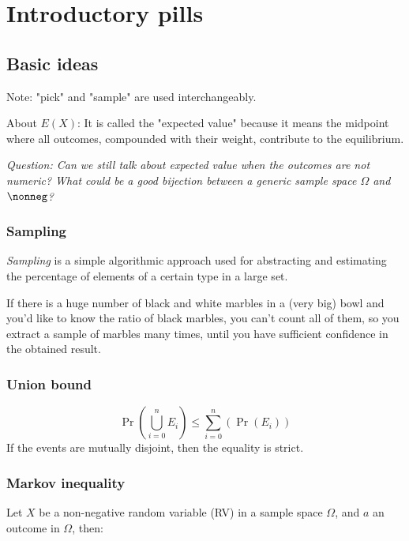 \chapter{Introductory pills}

\section{Basic ideas}

	Note: "pick" and "sample" are used interchangeably.

	About $E(X)$: It is called the "expected value" because it means the midpoint where all outcomes, compounded with their weight, contribute to the equilibrium.
	
	\textit{Question: Can we still talk about expected value when the outcomes are not numeric? What could be a good bijection between a generic sample space $\Omega$ and $\nonneg$?}
	
\subsection{Sampling}

	\textit{Sampling} is a simple algorithmic approach used for abstracting and estimating the percentage of elements of a certain type in a large set.
	
	\ex If there is a huge number of black and white marbles in a (very big) bowl and you'd like to know the ratio of black marbles, you can't count all of them, so you extract a sample of marbles many times, until you have sufficient confidence in the obtained result.


\subsection{Union bound}
	
	\begin{equation}
	\Pr\left(\bigcup_{i=0}^n E_i\right) \leq \sum_{i=0}^{n}(\Pr(E_i))
	\end{equation}
	If the events are mutually disjoint, then the equality is strict.

	
\subsection{Markov inequality}
	
	Let $X$ be a non-negative random variable (RV) in a sample space $\Omega$, and $a$ an outcome in $\Omega$, then:
	
